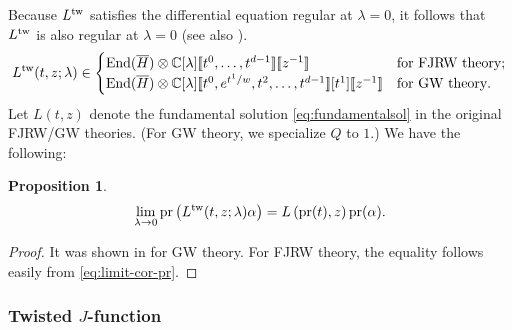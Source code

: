 \documentclass[11pt]{amsart}
\newtheorem{pro}[thm]{Proposition} %
\theoremstyle{definition} %
\theoremstyle{remark} %
\newcommand{\CC}{\mathbb C}
\newcommand{\End}{\operatorname{End}}
\newcommand{\tw}{{\rm tw}}
\newcommand{\pr}{\operatorname{pr}}
\newcommand{\ov}{\overline}
\begin{document}
Because $L^{\tw}$ satisfies the differential equation 
regular at $\lambda=0$, it follows that 
$L^{\tw}$ is also regular at $\lambda=0$ 
(see also \cite[Proposition 2.4]{Iritani:period}). 
\[
L^{\tw}(t,z;\lambda) 
\in 
\begin{cases} 
\End(\ov{H}) \otimes \CC[\lambda][\![t^0,\dots,t^{d-1}]\!][\![z^{-1}]\!] 
& \text{for FJRW theory;} \\
\End(\ov{H}) \otimes \CC[\lambda]
[\![t^0, e^{t^1/w}, t^2, \dots, t^{d-1}]\!][t^1][\![z^{-1}]\!]  
& \text{for GW theory}. 
\end{cases} 
\]
Let $L(t,z)$ denote the fundamental solution \eqref{eq:fundamentalsol}
in the original FJRW/GW theories. (For GW theory, 
we specialize $Q$ to $1$.) 
We have the following: 
\begin{pro}
\label{pro:Ltw-L}  
\[
\lim_{\lambda \to 0} \pr \left( L^\tw(t,z;\lambda) \alpha\right)  
= L\left(\pr(t), z\right) \pr(\alpha). 
\] 
\end{pro} 
\begin{proof} 
It was shown in \cite[Proposition 3.24]{Iritani:period} 
for GW theory. 
For FJRW theory, the equality follows easily 
from \eqref{eq:limit-cor-pr}. 
\end{proof} 
 

\subsubsection{Twisted $J$-function} 
\end{document}
